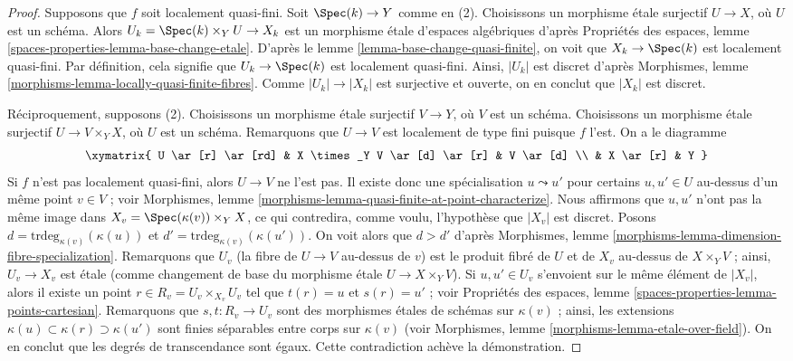 \begin{proof}
Supposons que $f$ soit localement quasi-fini. Soit $\Spec(k) \to Y$ comme
en (2). Choisissons un morphisme étale surjectif $U \to X$, où $U$ est un schéma.
Alors $U_k = \Spec(k) \times_Y U \to X_k$ est un
morphisme étale d'espaces algébriques d'après
Propriétés des espaces, lemme \ref{spaces-properties-lemma-base-change-etale}.
D'après le
lemme \ref{lemma-base-change-quasi-finite},
on voit que $X_k \to \Spec(k)$ est localement quasi-fini. Par
définition, cela signifie que $U_k \to \Spec(k)$ est localement
quasi-fini. Ainsi, $|U_k|$ est discret d'après
Morphismes, lemme \ref{morphisms-lemma-locally-quasi-finite-fibres}.
Comme $|U_k| \to |X_k|$ est surjective et ouverte, on en conclut que $|X_k|$
est discret.

\medskip\noindent
Réciproquement, supposons (2). Choisissons un morphisme étale surjectif $V \to Y$,
où $V$ est un schéma. Choisissons un morphisme étale surjectif
$U \to V \times_Y X$, où $U$ est un schéma.
Remarquons que $U \to V$ est localement de type fini puisque $f$ l'est.
On a le diagramme
$$
\xymatrix{
U \ar[r] \ar[rd] & X \times_Y V \ar[d] \ar[r] & V \ar[d] \\
& X \ar[r] & Y
}
$$
Si $f$ n'est pas localement quasi-fini, alors $U \to V$ ne l'est pas.
Il existe donc une spécialisation $u \leadsto u'$ pour certains $u, u' \in U$
au-dessus d'un même point $v \in V$ ; voir
Morphismes, lemme \ref{morphisms-lemma-quasi-finite-at-point-characterize}.
Nous affirmons que $u, u'$ n'ont pas la même image dans
$X_v = \Spec(\kappa(v)) \times_Y X$,
ce qui contredira, comme voulu, l'hypothèse que $|X_v|$ est discret.
Posons $d = \text{trdeg}_{\kappa(v)}(\kappa(u))$ et
$d' = \text{trdeg}_{\kappa(v)}(\kappa(u'))$.
On voit alors que $d > d'$ d'après
Morphismes, lemme \ref{morphisms-lemma-dimension-fibre-specialization}.
Remarquons que $U_v$ (la fibre de $U \to V$ au-dessus de $v$) est le produit fibré de
$U$ et de $X_v$ au-dessus de $X \times_Y V$ ; ainsi, $U_v \to X_v$ est étale (comme
changement de base du morphisme étale $U \to X \times_Y V$). Si
$u, u' \in U_v$ s'envoient sur le même élément de $|X_v|$, alors il existe un point
$r \in R_v = U_v \times_{X_v} U_v$ tel que $t(r) = u$ et $s(r) = u'$ ; voir
Propriétés des espaces, lemme \ref{spaces-properties-lemma-points-cartesian}.
Remarquons que $s, t : R_v \to U_v$ sont des morphismes étales de schémas
sur $\kappa(v)$ ; ainsi, les extensions $\kappa(u) \subset \kappa(r) \supset \kappa(u')$
sont finies séparables entre corps sur $\kappa(v)$ (voir
Morphismes, lemme \ref{morphisms-lemma-etale-over-field}).
On en conclut que les degrés de transcendance sont égaux.
Cette contradiction achève la démonstration.
\end{proof}

